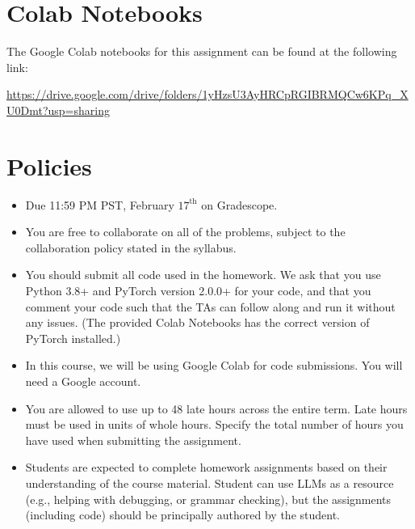 \newif\ifshowsolutions
\showsolutionstrue







\pagestyle{fancy}

\section*{Colab Notebooks}
The Google Colab notebooks for this assignment can be found at the following link:

\url{https://drive.google.com/drive/folders/1yHzsU3AyHRCpRGIBRMQCw6KPq_XU0Dmt?usp=sharing}

\newpage


\section*{Policies}
\begin{itemize}
	\item Due 11:59 PM PST, February $17^\text{th}$ on Gradescope. 
	\item You are free to collaborate on all of the problems, subject to the collaboration policy stated in the syllabus.
  \item You should submit all code used in the homework. We ask that you use Python 3.8+ and PyTorch version 2.0.0+ for your code, and that you comment your code such that the TAs can follow along and run it without any issues. (The provided Colab Notebooks has the correct version of PyTorch installed.)
  \item In this course, we will be using Google Colab for code submissions. You will need a Google account.
	\item You are allowed to use up to 48 late hours across the entire term. Late hours must be used in units of whole hours. Specify the total number of hours you have used when submitting the assignment.
	\item Students are expected to complete homework assignments based on their understanding of the course material. Student can use LLMs as a resource (e.g., helping with debugging, or grammar checking), but the assignments (including code) should be principally authored by the student.
\end{itemize}

